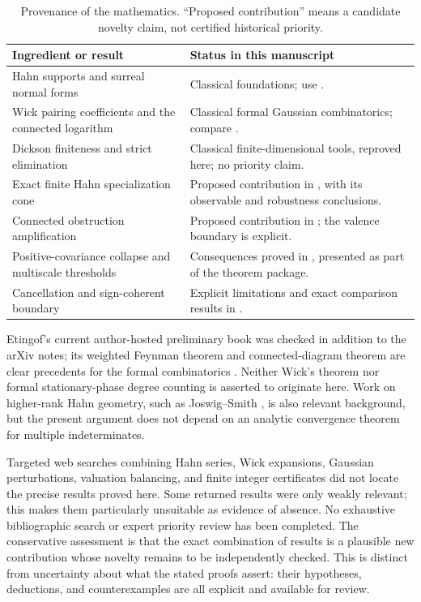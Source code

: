 \documentclass[11pt,letterpaper]{article}
\numberwithin{equation}{section}
\theoremstyle{definition}
\theoremstyle{remark}
\begin{document}
\begin{table}[ht]
\centering\small
\begin{tabularx}{\textwidth}{>{\raggedright\arraybackslash}p{}Y}
\toprule
Ingredient or result & Status in this manuscript\\
\midrule
Hahn supports and surreal normal forms & Classical foundations; use
\cite{Neumann,BM}.\\
Wick pairing coefficients and the connected logarithm & Classical formal
Gaussian combinatorics; compare \cite[Chapter 3]{Etingof}.\\
Dickson finiteness and strict elimination & Classical finite-dimensional
tools, reproved here; no priority claim.\\
Exact finite Hahn specialization cone & Proposed contribution in
, with its observable and robustness conclusions.\\
Connected obstruction amplification & Proposed contribution in
; the valence boundary is explicit.\\
Positive-covariance collapse and multiscale thresholds & Consequences proved
in , presented as part of the theorem package.\\
Cancellation and sign-coherent boundary & Explicit limitations and exact
comparison results in .\\
\bottomrule
\end{tabularx}
\caption{Provenance of the mathematics. ``Proposed contribution'' means a
candidate novelty claim, not certified historical priority.}
\label{wick:tab:novelty}
\end{table}

Etingof's current author-hosted preliminary book was checked in addition to
the arXiv notes; its weighted Feynman theorem and connected-diagram theorem
are clear precedents for the formal combinatorics \cite{Etingof}. Neither
Wick's theorem nor formal stationary-phase degree counting is asserted to
originate here. Work on higher-rank Hahn geometry, such as
Joswig--Smith \cite{JoswigSmith}, is also relevant background, but the
present argument does not depend on an analytic convergence theorem for
multiple indeterminates.

Targeted web searches combining Hahn series, Wick expansions, Gaussian
perturbations, valuation balancing, and finite integer certificates did not
locate the precise results proved here. Some returned results were only
weakly relevant; this makes them particularly unsuitable as evidence of
absence. No exhaustive bibliographic search or expert priority review has
been completed. The conservative assessment is that the exact combination
of results is a plausible new contribution whose novelty remains to be
independently checked. This is distinct from uncertainty about what the
stated proofs assert: their hypotheses, deductions, and counterexamples are
all explicit and available for review.
\end{document}
